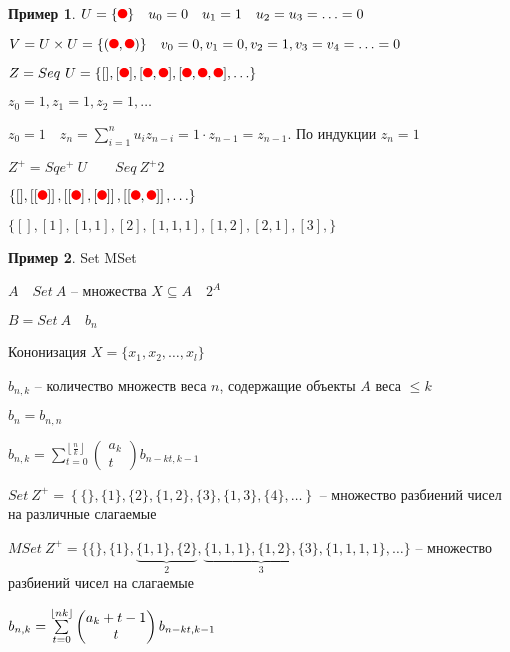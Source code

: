 \documentclass{book}
\theoremstyle{definition}
\newtheorem*{example}{Пример}
\begin{document}
\begin{example}
    $U = \{{\tikz \fill[red] (0,0) circle [radius =.12];}\}\quad u_0 = 0\quad u_1=1\quad u_2=u_3=\ldots=0$

    $V = U\times U = \{\left( {\tikz \fill[red] (0,0) circle [radius =.12];}, {\tikz \fill[red] (0,0) circle [radius =.12];} \right) \}\quad v_0=0, v_1=0, v_2=1, v_3=v_4=\ldots=0$

    $Z = Seq~U = \{[], [{\tikz \fill[red] (0,0) circle [radius =.12];}], [{\tikz \fill[red] (0,0) circle [radius =.12];}, {\tikz \fill[red] (0,0) circle [radius =.12];}], [{\tikz \fill[red] (0,0) circle [radius =.12];}, {\tikz \fill[red] (0,0) circle [radius =.12];}, {\tikz \fill[red] (0,0) circle [radius =.12];}], \ldots\}$

    $z_0=1, z_1=1, z_2=1, \ldots$

    $z_0=1\quad z_n = \sum_{i=1}^{n} u_iz_{n-i} = 1\cdot z_{n-1} = z_{n-1}$. По индукции $z_n=1$

     $Z^+ = Sqe^+~U\qquad Seq~Z^+2$
        
     $\{[], \left[ \left[ {\tikz \fill[red] (0,0) circle [radius =.12];} \right]  \right] , \left[ \left[ {\tikz \fill[red] (0,0) circle [radius =.12];} \right] , [{\tikz \fill[red] (0,0) circle [radius =.12];}] \right] , \left[ \left[ {\tikz \fill[red] (0,0) circle [radius =.12];}, {\tikz \fill[red] (0,0) circle [radius =.12];} \right]  \right] , \ldots\}$

     $\{[], [1], [1,1], [2], [1,1,1], [1,2], [2,1], [3], \}$
\end{example}

\begin{example}
    Set MSet

    $A\quad Set~A$ -- множества  $X\subseteq A\quad 2^A$

    $B = Set~A\quad b_n$

    Кононизация  $X = \{x_1, x_2, \ldots, x_l\}$

    $b_{n,k}$ -- количество множеств веса $n$, содержащие объекты  $A$ веса  $\leqslant k$

    $b_n = b_{n,n}$

    $b_{n,k} = \sum_{t=0}^{\left\lfloor \frac{n}{k} \right\rfloor} \begin{pmatrix} a_k\\t \end{pmatrix} b_{n-kt,k-1} $ 

    $Set~Z^+ = \left\{ \{\}, \{1\}, \{2\}, \{1,2\}, \{3\}, \{1,3\}, \{4\}, \ldots \right\} $ -- множество разбиений чисел на различные слагаемые

    $MSet~Z^+ = \{\{\}, \{1\}, \underbrace{\{1,1\},\{2\}}\limits_{2},\underbrace{\{1,1,1\},\{1,2\},\{3\}}\limits_{3},\{1,1,1,1\}, \ldots\}$ -- множество разбиений чисел на слагаемые               

    $b_{n,k} = \sum_{t=0}^{\left\lfloor n\\k \right\rfloor} \begin{pmatrix} a_k+t-1\\t \end{pmatrix} b_{n-kt,k-1}$
\end{example}
\end{document}
